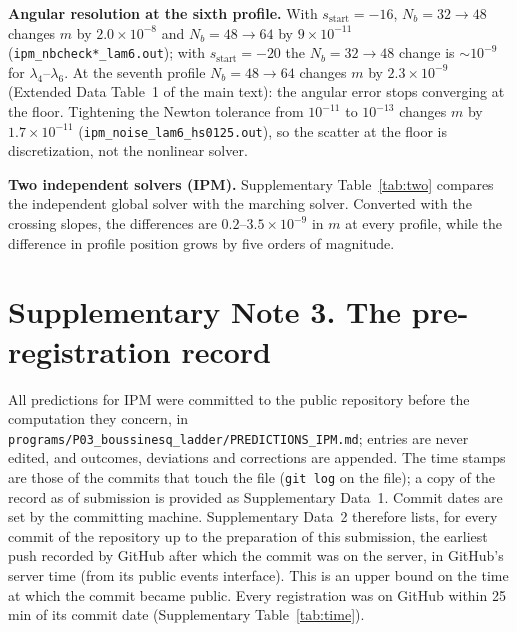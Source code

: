\documentclass[10pt]{article}
\newcommand{\sstart}{s_{\mathrm{start}}}
\begin{document}
\begin{table}[h]
\centering
\caption{\textbf{Origin truncation and Newton residual floor.}}
\label{tab:trunc}
\small

\end{table}

\textbf{Angular resolution at the sixth profile.} With $\sstart=-16$, $N_b=32\to48$ changes $m$ by $2.0\times10^{-8}$
and $N_b=48\to64$ by $9\times10^{-11}$ (\texttt{ipm\_nbcheck*\_lam6.out}); with $\sstart=-20$ the $N_b=32\to48$ change
is $\sim10^{-9}$ for $\lambda_4$--$\lambda_6$. At the seventh profile $N_b=48\to64$ changes $m$ by $2.3\times10^{-9}$
(Extended Data Table~1 of the main text): the angular error stops converging at the floor. Tightening the Newton tolerance from $10^{-11}$
to $10^{-13}$ changes $m$ by $1.7\times10^{-11}$ (\texttt{ipm\_noise\_lam6\_hs0125.out}), so the scatter at the floor
is discretization, not the nonlinear solver.

\textbf{Two independent solvers (IPM).} Supplementary Table~\ref{tab:two} compares the independent global solver
with the marching solver. Converted with the crossing slopes, the differences are $0.2$--$3.5\times10^{-9}$ in $m$ at
every profile, while the difference in profile position grows by five orders of magnitude.

\begin{table}[h]
\centering
\caption{\textbf{IPM profiles from two independent solvers} (\texttt{ipm\_glob\_*.log}). At $h_s=0.00625$ the global
solver did not converge for $n=5$, $6$ within 15 Newton iterations (logged, not used).}
\label{tab:two}
\small

\end{table}

\section*{Supplementary Note 3. The pre-registration record}

All predictions for IPM were committed to the public repository before the computation they concern, in
\texttt{programs/P03\_boussinesq\_ladder/PREDICTIONS\_IPM.md}; entries are never edited, and outcomes, deviations
and corrections are appended. The time stamps are those of the commits that touch the file
(\texttt{git log} on the file); a copy of the record as of submission is provided as Supplementary Data~1. Commit
dates are set by the committing machine. Supplementary Data~2 therefore lists, for every commit of the repository up
to the preparation of this submission, the earliest push recorded by GitHub after which the commit was on the server,
in GitHub's server time (from its public events interface). This is an upper bound on the time at which the commit
became public. Every registration was on GitHub within 25 min of its commit date (Supplementary Table~\ref{tab:time}).
\end{document}
